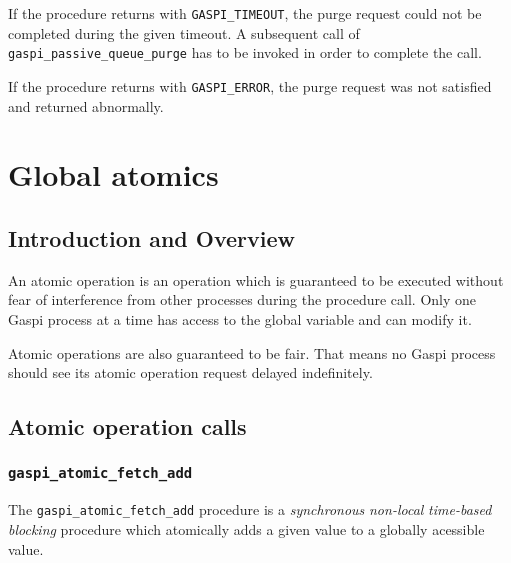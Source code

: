 \documentclass[a4paper]{article}
\newlength{\st}\setlength{\st}{0pt}
\newcommand{\zsep}[1]{#1}
\newcommand{\gaspiprefix}{gaspi}
\newcommand{\GASPI}{{\sc Gaspi}}
\newcommand{\function}[1]{{\tt #1}}
\newcommand{\gaspifunction}[1]{\function{\protect\zsep{\gaspiprefix\_#1}}}
\newcommand{\GASPITIME}{{\tt\protect\zsep{GASPI\_TIMEOUT}}}
\newcommand{\GASPIGERR}{{\tt\protect\zsep{GASPI\_ERROR}}}
\newcommand{\gaspisemantic}[1]{{\emph{#1}}}
\begin{document}
If the procedure returns with \GASPITIME{}, the purge request could
not be completed during the given timeout. A subsequent call of
\gaspifunction{passive\_queue\_purge} has to be invoked in order to
complete the call.

If the procedure returns with \GASPIGERR{}, the purge request was not
satisfied and returned abnormally.

\section{Global atomics}

\subsection{Introduction and Overview}

An atomic operation is an operation which is guaranteed to be executed
without fear of interference from other processes during the procedure
call. Only one \GASPI{} process at a time has access to the global
variable and can modify it.

Atomic operations are also guaranteed to be fair. That means no \GASPI{}
process should see its atomic operation request
delayed indefinitely.

\subsection{Atomic operation calls}

\subsubsection{\gaspifunction{atomic\_fetch\_add}}

The \gaspifunction{atomic\_fetch\_add} procedure is a
\gaspisemantic{synchronous} \gaspisemantic{non-local}
\gaspisemantic{time-based blocking} procedure which atomically adds a
given value to a globally acessible value.
\end{document}
